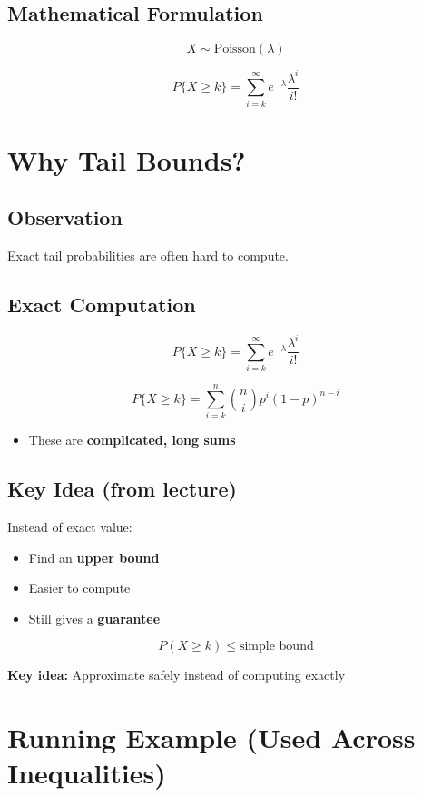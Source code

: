 \documentclass[11pt]{article}
\begin{document}
\subsection*{Mathematical Formulation}

\[
X \sim \text{Poisson}(\lambda)
\]

\[
P\{X \ge k\} = \sum_{i=k}^{\infty} e^{-\lambda} \frac{\lambda^i}{i!}
\]

\section*{Why Tail Bounds?}

\subsection*{Observation}

Exact tail probabilities are often hard to compute.

\subsection*{Exact Computation}

\[
P\{X \ge k\} = \sum_{i=k}^{\infty} e^{-\lambda} \frac{\lambda^i}{i!}
\]

\[
P\{X \ge k\} = \sum_{i=k}^{n} \binom{n}{i} p^i (1-p)^{n-i}
\]

\begin{itemize}
\item These are \textbf{complicated, long sums}
\end{itemize}

\subsection*{Key Idea (from lecture)}

Instead of exact value:

\begin{itemize}
\item Find an \textbf{upper bound}
\item Easier to compute
\item Still gives a \textbf{guarantee}
\end{itemize}

\[
P(X \ge k) \le \text{simple bound}
\]

\textbf{Key idea:} Approximate safely instead of computing exactly

\section*{Running Example (Used Across Inequalities)}
\end{document}
